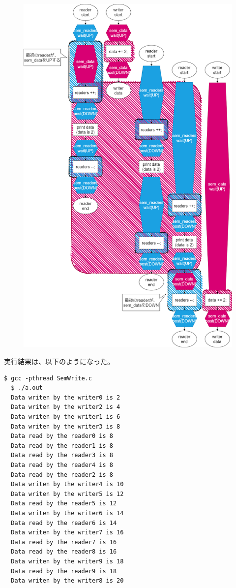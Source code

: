 \documentclass[a4paper,10pt]{jsarticle}
\begin{document}
\begin{figure}[H]
  \centering
  \includegraphics[width=15cm]{01.drawio.png}
\end{figure}

実行結果は、以下のようになった。

\begin{lstlisting}[caption={実行結果},label={実行結果}]
  $ gcc -pthread SemWrite.c
  $ ./a.out
  Data writen by the writer0 is 2
  Data writen by the writer2 is 4
  Data writen by the writer1 is 6
  Data writen by the writer3 is 8
  Data read by the reader0 is 8
  Data read by the reader1 is 8
  Data read by the reader3 is 8
  Data read by the reader4 is 8
  Data read by the reader2 is 8
  Data writen by the writer4 is 10
  Data writen by the writer5 is 12
  Data read by the reader5 is 12
  Data writen by the writer6 is 14
  Data read by the reader6 is 14
  Data writen by the writer7 is 16
  Data read by the reader7 is 16
  Data read by the reader8 is 16
  Data writen by the writer9 is 18
  Data read by the reader9 is 18
  Data writen by the writer8 is 20
\end{lstlisting}
\end{document}
